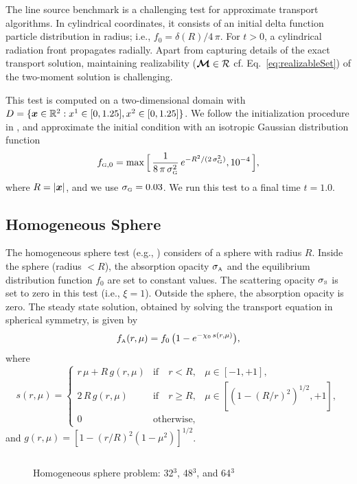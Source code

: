 The line source benchmark \citep[cf.][]{brunner_2002,garrettHauck_2013} is a challenging test for approximate transport algorithms.  
In cylindrical coordinates, it consists of an initial delta function particle distribution in radius; i.e., $f_{0}=\delta(R)/4\,\pi$.  
For $t>0$, a cylindrical radiation front propagates radially.  
Apart from capturing details of the exact transport solution, maintaining realizability ($\boldsymbol{\mathcal{M}}\in\mathcal{R}$ cf. Eq.~\eqref{eq:realizableSet}) of the two-moment solution is challenging.  

This test is computed on a two-dimensional domain with $D=\{\boldsymbol{x}\in\mathbb{R}^{2}:x^{1}\in[0,1.25], x^{2}\in[0,1.25]\}$.  
We follow the initialization procedure in \citet{garrettHauck_2013}, and approximate the initial condition with an isotropic Gaussian distribution function
\begin{equation}
  f_{\mbox{\tiny G},0}
  =\max\Big[\,\frac{1}{8\,\pi\,\sigma_{\mbox{\tiny G}}^{2}}\,e^{-R^{2}/(2\,\sigma_{\mbox{\tiny G}}^{2})},10^{-4}\,\Big],
\end{equation}
where $R=|\boldsymbol{x}|$, and we use $\sigma_{\mbox{\tiny G}}=0.03$.  
We run this test to a final time $t=1.0$.  

\subsection{Homogeneous Sphere}

The homogeneous sphere test (e.g., \cite{smit_etal_1997}) considers of a sphere with radius $R$.  
Inside the sphere (radius $<R$), the absorption opacity $\sigma_{\mbox{\tiny A}}$ and the equilibrium distribution function $f_{0}$ are set to constant values.  
The scattering opacity $\sigma_{\mbox{\tiny S}}$ is set to zero in this test (i.e., $\xi=1$).  
Outside the sphere, the absorption opacity is zero.  
The steady state solution, obtained by solving the transport equation in spherical symmetry, is given by
\begin{equation}
  f_{\mbox{\tiny A}}(r,\mu)=f_{0}\,\big(1-e^{-\chi_{0}\,s(r,\mu)}\big),
  \label{eq:distributionHomogeneousSphere}
\end{equation}
where
\begin{equation}
  s(r,\mu)
  =\left\{
  \begin{array}{lll}
    r\,\mu+R\,g(r,\mu) & \mbox{if}\quad r<R, & \mu\in[-1,+1], \\
    2\,R\,g(r,\mu) & \mbox{if}\quad r \ge R, & \mu\in[(1-(R/r)^{2})^{1/2},+1], \\
    0 & \mbox{otherwise},
  \end{array}
  \right.
\end{equation}
and $g(r,\mu)=[1-(r/R)^{2}(1-\mu^{2})]^{1/2}$.  

\begin{figure}[h]
  \centering
  \begin{tabular}{cc}
  \end{tabular}
   \caption{Homogeneous sphere problem: 32$^{3}$, 48$^{3}$, and 64$^{3}$}
  \label{fig:HomogeneousSphere_Resolution}
\end{figure}